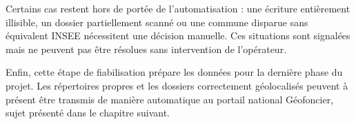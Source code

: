 Certains cas restent hors de portée de l'automatisation : une écriture entièrement illisible, un dossier partiellement scanné ou une commune disparue sans équivalent INSEE nécessitent une décision manuelle. Ces situations sont signalées mais ne peuvent pas être résolues sans intervention de l'opérateur.

Enfin, cette étape de fiabilisation prépare les données pour la dernière phase du projet. Les répertoires propres et les dossiers correctement géolocalisés peuvent à présent être transmis de manière automatique au portail national Géofoncier, sujet présenté dans le chapitre suivant.





